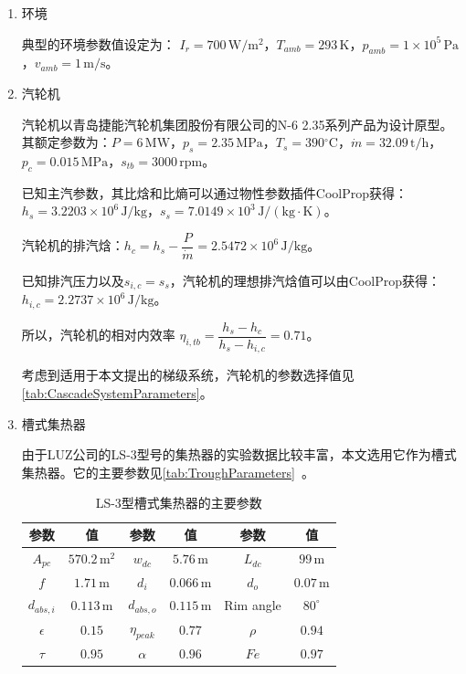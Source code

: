 \begin{enumerate}[label=(\arabic*)]

\item 环境

\setlength\parindent{2em}典型的环境参数值设定为：
$I_r = 700\,\mathrm{W/m^2}$，$T_{amb} = 293\,\mathrm{K}$，$p_{amb} = 1\times10^5\,\mathrm{Pa}$，$v_{amb} = 1\,\mathrm{m/s}$。

\item 汽轮机

汽轮机以青岛捷能汽轮机集团股份有限公司的N-6 2.35系列产品为设计原型。其额定参数为：$P = 6\,\mathrm{MW}$，$p_s = 2.35\,\mathrm{MPa}$，$T_s = 390\mathrm{^\circ C}$，$\dot{m} = 32.09\,\mathrm{t/h}$，$p_c = 0.015\,\mathrm{MPa}$，$s_{tb} = 3000\,\mathrm{rpm}$。
	
	已知主汽参数，其比焓和比熵可以通过物性参数插件CoolProp获得：$h_s = 3.2203\times10^6\,\mathrm{J/kg}$，$s_s = 7.0149\times10^3\,\mathrm{J/(kg\cdot K)}$。
	
	汽轮机的排汽焓：$h_{c} = h_{s} - \dfrac{P}{\dot{m}} = 2.5472\times10^6\,\mathrm{J/kg}$。
	
	已知排汽压力以及$s_{i,c} = s_s$，汽轮机的理想排汽焓值可以由CoolProp获得：$h_{i,c} = 2.2737\times10^6\,\mathrm{J/kg}$。
	
	所以，汽轮机的相对内效率
	$\eta_{i,tb} = \dfrac{h_s - h_c}{h_{s} - h_{i,c}} = 0.71$。
	
	考虑到适用于本文提出的梯级系统，汽轮机的参数选择值见\autoref{tab:CascadeSystemParameters}。
		 
\item 槽式集热器

由于LUZ公司的LS-3型号的集热器的实验数据比较丰富，本文选用它作为槽式集热器。它的主要参数见\autoref{tab:TroughParameters}~\cite{Fernandez2010}。

\begin{table}[htbp]
\setlength{\abovecaptionskip}{0pt}
	\caption{LS-3型槽式集热器的主要参数}
	\centering
	\begin{tabular}{cccccc}
		\toprule
		参数		&	值	&	参数		&	值	&	参数		&	值\\
		\midrule
		$A_{pc}$		&	$570.2\,\mathrm{m^2}$	&	$w_{dc}$	&	$5.76\,\mathrm{m}$	&	$L_{dc}$	&	$99\,\mathrm{m}$\\
		$f$	&	$1.71\,\mathrm{m}$	&	$d_i$		&	$0.066\,\mathrm{m}$	&	$d_o$	&	$0.07\,\mathrm{m}$\\
		$d_{abs,i}$	&	$0.113\,\mathrm{m}$	&	$d_{abs,o}$	&	$0.115\,\mathrm{m}$	&	Rim angle	&	$80^\circ$\\
		$\epsilon$		&	$0.15$	&	$\eta_{peak}$	&	$0.77$	&	$\rho$	&	$0.94$\\
		$\tau$	&	$0.95$	&	
$\alpha$	&	$0.96$	&	$Fe$	&	$0.97$\\
		\bottomrule
	\end{tabular}
	\label{tab:TroughParameters}
\end{table}


\end{enumerate}

